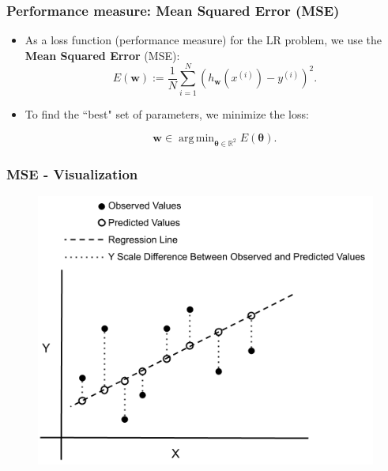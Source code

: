\documentclass{beamer}
\DeclareMathOperator*{\argmin}{arg\,min}
\begin{document}
	\begin{frame}
		\frametitle{Performance measure: Mean Squared Error (MSE)}
		\begin{itemize}
			\item As a loss function (performance measure) for the LR problem, we use the \textbf{Mean Squared Error} (MSE):
			$$E({\bm{w}}) := \frac{1}{N} \sum_{i=1}^{N} (h_{\bm{w}}(x^{(i)}) - y^{(i)})^2.$$
			\item To find the ``best" set of parameters, we minimize the loss:
			
			$$\bm{w} \in \argmin_{\bm{\theta} \in \mathbb{R}^2} E(\bm{\theta}).$$
		\end{itemize}
	\end{frame}

	\begin{frame}
		\frametitle{MSE - Visualization}
		\begin{figure}
			\centering
			\includegraphics[scale=0.5]{images/mse}
		\end{figure}
	\end{frame}
	
\end{document}
